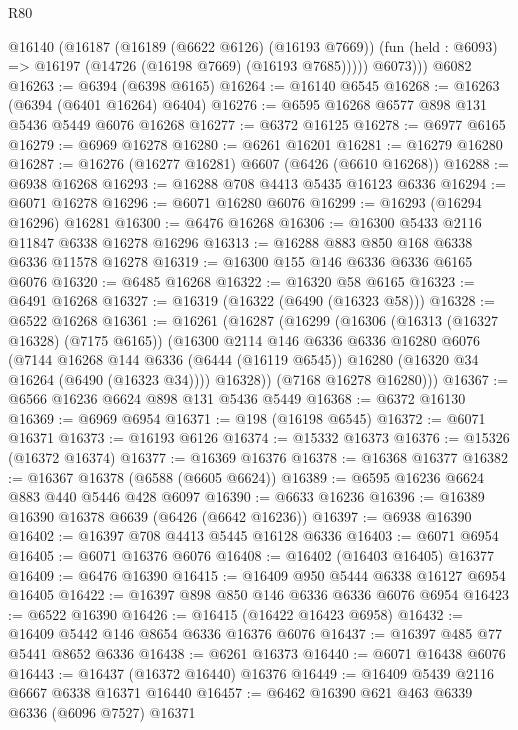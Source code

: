 \begin{lexlean}{R80}
\begin{coremodule}
        @16140
          (@16187
            (@16189 (@6622 @6126) (@16193 @7669))
            (fun (held : @6093) => @16197 (@14726 (@16198 @7669) (@16193 @7685)))))
          @6073)))
    @6082
@16263 := @6394 (@6398 @6165)
@16264 := @16140 @6545
@16268 := @16263 (@6394 (@6401 @16264) @6404)
@16276 := @6595 @16268 @6577 @898 @131 @5436 @5449 @6076 @16268
@16277 := @6372 @16125
@16278 := @6977 @6165
@16279 := @6969 @16278
@16280 := @6261 @16201
@16281 := @16279 @16280
@16287 := @16276 (@16277 @16281) @6607 (@6426 (@6610 @16268))
@16288 := @6938 @16268
@16293 := @16288 @708 @4413 @5435 @16123 @6336
@16294 := @6071 @16278
@16296 := @6071 @16280 @6076
@16299 := @16293 (@16294 @16296) @16281
@16300 := @6476 @16268
@16306 := @16300 @5433 @2116 @11847 @6338 @16278 @16296
@16313 := @16288 @883 @850 @168 @6338 @6336 @11578 @16278
@16319 := @16300 @155 @146 @6336 @6336 @6165 @6076
@16320 := @6485 @16268
@16322 := @16320 @58 @6165
@16323 := @6491 @16268
@16327 := @16319 (@16322 (@6490 (@16323 @58)))
@16328 := @6522 @16268
@16361 := @16261
    (@16287
      (@16299
        (@16306
          (@16313 (@16327 @16328) (@7175 @6165))
          (@16300
            @2114
            @146
            @6336
            @6336
            @16280
            @6076
            (@7144
              @16268
              @144
              @6336
              (@6444 (@16119 @6545))
              @16280
              (@16320 @34 @16264 (@6490 (@16323 @34))))
            @16328))
        (@7168 @16278 @16280)))
@16367 := @6566 @16236 @6624 @898 @131 @5436 @5449
@16368 := @6372 @16130
@16369 := @6969 @6954
@16371 := @198 (@16198 @6545)
@16372 := @6071 @16371
@16373 := @16193 @6126
@16374 := @15332 @16373
@16376 := @15326 (@16372 @16374)
@16377 := @16369 @16376
@16378 := @16368 @16377
@16382 := @16367 @16378 (@6588 (@6605 @6624))
@16389 := @6595 @16236 @6624 @883 @440 @5446 @428 @6097
@16390 := @6633 @16236
@16396 := @16389 @16390 @16378 @6639 (@6426 (@6642 @16236))
@16397 := @6938 @16390
@16402 := @16397 @708 @4413 @5445 @16128 @6336
@16403 := @6071 @6954
@16405 := @6071 @16376 @6076
@16408 := @16402 (@16403 @16405) @16377
@16409 := @6476 @16390
@16415 := @16409 @950 @5444 @6338 @16127 @6954 @16405
@16422 := @16397 @898 @850 @146 @6336 @6336 @6076 @6954
@16423 := @6522 @16390
@16426 := @16415 (@16422 @16423 @6958)
@16432 := @16409 @5442 @146 @8654 @6336 @16376 @6076
@16437 := @16397 @485 @77 @5441 @8652 @6336
@16438 := @6261 @16373
@16440 := @6071 @16438 @6076
@16443 := @16437 (@16372 @16440) @16376
@16449 := @16409 @5439 @2116 @6667 @6338 @16371 @16440
@16457 := @6462 @16390 @621 @463 @6339 @6336 (@6096 @7527) @16371

\end{coremodule}
\end{lexlean}
